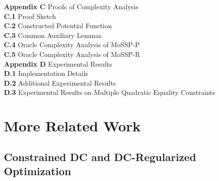 \documentclass{article}
\theoremstyle{plain}
\theoremstyle{definition}
\theoremstyle{remark}
\numberwithin{equation}{section}
\begin{document}
\noindent \textbf{Appendix C} \quad Proofs of Complexity Analysis \dotfill \pageref{appendix:proofs of the main results} \\
\noindent \hspace*{2em} \textbf{C.1} \quad Proof Sketch \dotfill \pageref{sub:proof-sketch} \\
\noindent \hspace*{2em} \textbf{C.2} \quad Constructed Potential Function \dotfill \pageref{Sub: constructed potential function} \\
\noindent \hspace*{2em} \textbf{C.3} \quad Common Auxiliary Lemmas \dotfill \pageref{Subsection: auxiliary lemmas} \\
\noindent \hspace*{2em} \textbf{C.4} \quad Oracle Complexity Analysis of MoSSP-P \dotfill \pageref{Subsection: Lemmas for Oracle complexity analysis of Algo 1} \\
\noindent \hspace*{2em} \textbf{C.5} \quad Oracle Complexity Analysis of MoSSP-R \dotfill \pageref{Subsection: Lemmas for Oracle complexity analysis of Algo 2} \\

\noindent \textbf{Appendix D} \quad Experimental Results \dotfill \pageref{appendix:complete experiment results} \\
\noindent \hspace*{2em} \textbf{D.1} \quad Implementation Details \dotfill \pageref{app:implementation_details} \\
\noindent \hspace*{2em} \textbf{D.2} \quad Additional Experimental Results \dotfill \pageref{app:additional_experimental_results} \\
\noindent \hspace*{2em} \textbf{D.3} \quad Experimental Results on Multiple Quadratic Equality Constraints \dotfill \pageref{subsec:multiple_quadratic_equalities} \\

\hrulefill
\newpage

\section{More Related Work}
\label{appendix:related_work}
\subsection{Constrained DC and DC-Regularized Optimization}
\label{app:related_work_constrained_dc}
\end{document}
